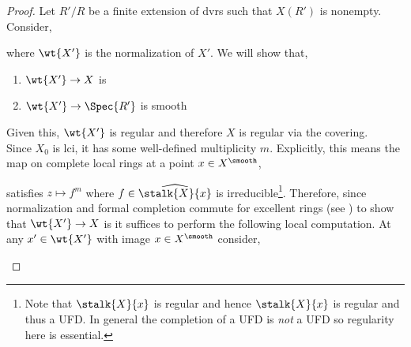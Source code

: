\documentclass[12pt]{article}
\begin{document}
\begin{proof}
Let $R' / R$ be a finite extension of dvrs such that $X(R')$ is nonempty. Consider,
\begin{center}
\end{center}
where $\wt{X'}$ is the normalization of $X'$. We will show that,
\begin{enumerate}
\item  $\wt{X'} \to X$ is \etale
\item  $\wt{X'} \to \Spec{R'}$ is smooth
\end{enumerate}
Given this, $\wt{X'}$ is regular and therefore $X$ is regular via the \etale covering. 
\bigskip\\
Since $X_0$ is lci, it has some well-defined multiplicity $m$. Explicitly, this means the map on complete local rings at a point $x \in X^{\smooth}$,
\begin{center}
\end{center}
satisfies $z \mapsto f^m$ where $f \in \widehat{\stalk{X}{x}}$ is irreducible\footnote{Note that $\stalk{X}{x}$ is regular and hence $\stalk{X}{x}$ is regular and thus a UFD. In general the completion of a UFD is \textit{not} a UFD so regularity here is essential.}. Therefore, since normalization and formal completion commute for excellent rings (see ) to show that $\wt{X'} \to X$ is \etale it suffices to perform the following local computation. At any $x' \in \wt{X'}$ with image $x \in X^{\smooth}$ consider,
\begin{center}
\end{center}
\end{proof}
\end{document}
